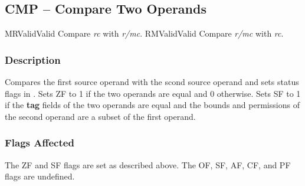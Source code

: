 \clearpage
{}
{}
\subsection*{CMP -- Compare Two Operands}

\begin{x86opcodetable}
  {MR}{Valid}{Valid}
  {Compare \emph{rc} with \emph{r/mc}.}
  {RM}{Valid}{Valid}
  {Compare \emph{r/mc} with \emph{rc}.}
\end{x86opcodetable}

\begin{x86opentable}
\end{x86opentable}

\subsubsection*{Description}

Compares the first source operand with the scond source operand and
sets status flags in \RFLAGS{}.  Sets ZF to 1 if the two operands are
equal and 0 otherwise.  Sets SF to 1 if the \textbf{tag} fields of the
two operands are equal and the bounds and permissions of the second
operand are a subset of the first operand.

\subsubsection*{Flags Affected}

The ZF and SF flags are set as described above.  The OF, SF, AF, CF,
and PF flags are undefined.
